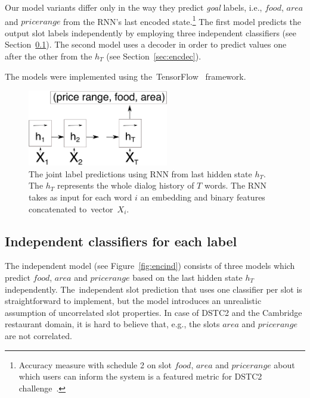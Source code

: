 \documentclass{itatnew}
\begin{document}
Our model variants differ only in the way they predict {\it goal} labels, i.e., $food$, $area$ and $price range$ from the RNN's last encoded state.\footnote{Accuracy measure with schedule 2 on slot $food$, $area$ and $price range$ about which users can inform the system is a featured metric for DSTC2 challenge~\cite{henderson2014second}.} 
The first model predicts the output slot labels independently by employing three independent classifiers (see Section~\ref{sec:indep}).
The second model uses a decoder in order to predict values one after the other from the $h_{T}$ (see Section~\ref{sec:encdec}).

The models were implemented using the~TensorFlow~\cite{abaditensorflow} framework. 

\begin{figure}
\vspace{-0.80em}
\begin{center}
\includegraphics[height=9em]{encoder_joint}
\caption{The joint label predictions using RNN from last hidden state $h_T$. The $h_T$ represents the whole dialog history of $T$ words. The RNN takes as input for each word $i$ an embedding and binary features concatenated to~vector~$X_{i}$.}
\end{center}
\vspace{-0.70em}
\label{fig:encjoint}
\end{figure}

\subsection{Independent classifiers for each label}
\label{sec:indep}
The independent model (see Figure~\ref{fig:encind}) consists of three models which predict $food$, $area$ and $price range$ based on the last hidden state $h_{T}$ independently.
The~independent slot prediction that uses one classifier per slot is straightforward to implement, but the model introduces an unrealistic assumption of uncorrelated slot properties.
In case of DSTC2 and the Cambridge restaurant domain, it is hard to believe that, e.g., the slots $area$ and $price range$ are not correlated.
\end{document}

